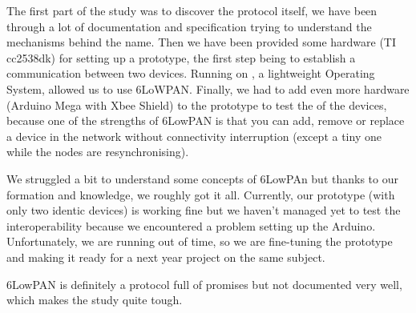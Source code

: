 {The first part of the study was to discover the protocol itself, we have been through a lot of documentation and specification trying to understand the mechanisms behind the name.
Then we have been provided some hardware (TI cc2538dk) for setting up a prototype, the first step being to establish a communication between two devices.
Running on , a lightweight Operating System, allowed us to use 6LoWPAN.
Finally, we had to add even more hardware (Arduino Mega with Xbee Shield) to the prototype to test the  of the devices, because one of the strengths of 6LowPAN is that you can add, remove or replace a device in the network without connectivity
interruption (except a tiny one while the nodes are resynchronising). 

We struggled a bit to understand some concepts of 6LowPAn but thanks to our formation and knowledge, we roughly got it all. 
Currently, our prototype (with only two identic devices) is working fine but we haven’t managed yet to test the interoperability because we encountered a problem setting up the Arduino. Unfortunately, we are running out of time, so we are fine-tuning the prototype and making it ready for a next year project on the same subject.
 
6LowPAN is definitely a protocol full of promises but not documented very well, which makes the study quite tough.
}
